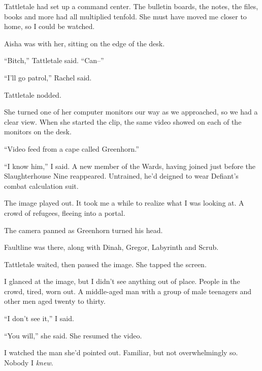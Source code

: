 Tattletale had set up a command center.  The bulletin boards, the notes, the files, books and more had all multiplied tenfold.  She must have moved me closer to home, so I could be watched.



Aisha was with her, sitting on the edge of the desk.



``Bitch,'' Tattletale said.  ``Can--''



``I'll go patrol,'' Rachel said.



Tattletale nodded.



She turned one of her computer monitors our way as we approached, so we had a clear view.  When she started the clip, the same video showed on each of the monitors on the desk.



``Video feed from a cape called Greenhorn.''



``I know him,'' I said.  A new member of the Wards, having joined just before the Slaughterhouse Nine reappeared.  Untrained, he'd deigned to wear Defiant's combat calculation suit.



The image played out.  It took me a while to realize what I was looking at.  A crowd of refugees, fleeing into a portal.



The camera panned as Greenhorn turned his head.



Faultline was there, along with Dinah, Gregor, Labyrinth and Scrub.



Tattletale waited, then paused the image.  She tapped the screen.



I glanced at the image, but I didn't see anything out of place.  People in the crowd, tired, worn out.  A middle-aged man with a group of male teenagers and other men aged twenty to thirty.



``I don't see it,'' I said.



``You will,'' she said.  She resumed the video.



I watched the man she'd pointed out.  Familiar, but not overwhelmingly so.  Nobody I \emph{knew}.



